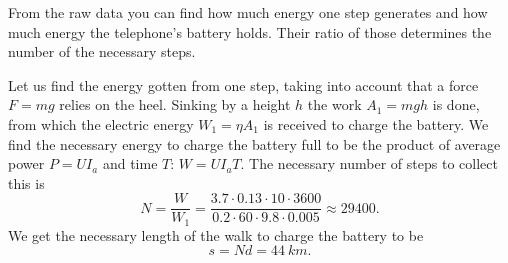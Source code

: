 \hinteng
From the raw data you can find how much energy one step generates and how much energy the telephone’s battery holds. Their ratio of those determines the number of the necessary steps.

\solueng
Let us find the energy gotten from one step, taking into account that a force $F=mg$ relies on the heel. Sinking by a height $h$ the work $A_1 = mgh$ is done, from which the electric energy $W_1=\eta A_1$ is received to charge the battery. We find the necessary energy to charge the battery full to be the product of average power $P=UI_a$ and time $T$: $W=UI_aT$. The necessary number of steps to collect this is 
\[N = \frac{W}{W_1} = \frac{3.7 \cdot 0.13 \cdot 10 \cdot 3600 }{0.2 \cdot 60\cdot 9.8 \cdot 0.005}\approx29400.\]
We get the necessary length of the walk to charge the battery to be
\[s=Nd = \SI{44}{km}.\]
\probend